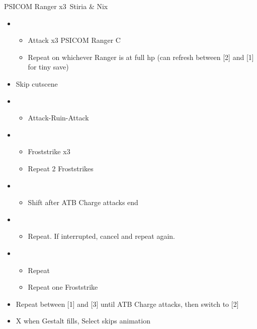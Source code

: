 \begin{paracol}{2}
	\switchcolumn
	\begin{battle}{PSICOM Ranger x3\, Stiria \& Nix}
		\begin{itemize}
			\item \first
			      \begin{itemize}
				      \item Attack x3 PSICOM Ranger C
				      \item Repeat on whichever Ranger is at full hp (can refresh between [2] and [1] for tiny save)
			      \end{itemize}
			\item Skip cutscene
			\item \first
			      \begin{itemize}
				      \item Attack-Ruin-Attack
			      \end{itemize}
			\item \third
			      \begin{itemize}
				      \item Froststrike x3
				      \item Repeat 2 Froststrikes
			      \end{itemize}
			\item \second
			      \begin{itemize}
				      \item Shift after ATB Charge attacks end
			      \end{itemize}
			\item \first
			      \begin{itemize}
				      \item Repeat. If interrupted, cancel and repeat again.
			      \end{itemize}
			\item \third
			      \begin{itemize}
				      \item Repeat
				      \item Repeat one Froststrike
			      \end{itemize}
			\item Repeat between [1] and [3] until ATB Charge attacks, then switch to [2]
			\item X when Gestalt fills, Select skips animation
		\end{itemize}
		 
	\end{battle}
\end{paracol}